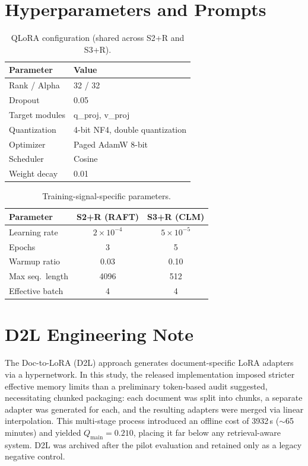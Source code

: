 \newpage
\begin{appendices}

\section{Hyperparameters and Prompts}

\begin{table}[ht]
\centering
\caption{QLoRA configuration (shared across S2+R and S3+R).}
\small
\begin{tabular}{ll}
\toprule
\textbf{Parameter} & \textbf{Value} \\
\midrule
Rank / Alpha     & 32 / 32 \\
Dropout          & 0.05 \\
Target modules   & q\_proj, v\_proj \\
Quantization     & 4-bit NF4, double quantization \\
Optimizer        & Paged AdamW 8-bit \\
Scheduler        & Cosine \\
Weight decay     & 0.01 \\
\bottomrule
\end{tabular}
\end{table}

\begin{table}[ht]
\centering
\caption{Training-signal-specific parameters.}
\small
\begin{tabular}{lcc}
\toprule
\textbf{Parameter} & \textbf{S2+R (RAFT)} & \textbf{S3+R (CLM)} \\
\midrule
Learning rate    & $2 \times 10^{-4}$ & $5 \times 10^{-5}$ \\
Epochs           & 3                  & 5 \\
Warmup ratio     & 0.03               & 0.10 \\
Max seq.\ length & 4096               & 512 \\
Effective batch  & 4                  & 4 \\
\bottomrule
\end{tabular}
\end{table}

\section{D2L Engineering Note}

The Doc-to-LoRA (D2L) approach generates document-specific LoRA adapters via a hypernetwork. In this study, the released implementation imposed stricter effective memory limits than a preliminary token-based audit suggested, necessitating chunked packaging: each document was split into chunks, a separate adapter was generated for each, and the resulting adapters were merged via linear interpolation. This multi-stage process introduced an offline cost of 3932\,s ($\sim$65 minutes) and yielded $Q_{\text{main}} = 0.210$, placing it far below any retrieval-aware system. D2L was archived after the pilot evaluation and retained only as a legacy negative control.


\end{appendices}
